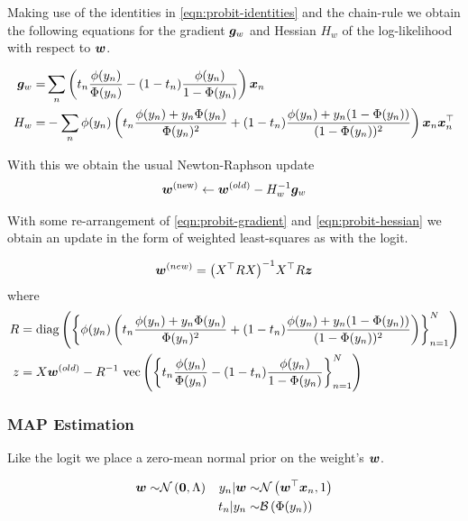 Making use of the identities in \eqref{eqn:probit-identities} and the chain-rule we obtain the following equations for the gradient $\bm g_w$ and Hessian $H_w$ of the log-likelihood with respect to $\bm w$.

\begin{align}
\bm g_w = & \sum_n \left( t_n \frac{\phi(y_n)}{\Phi(y_n)} - (1 - t_n) \frac{\phi(y_n)}{1 - \Phi(y_n)} \right) \bm x_n \label{eqn:probit-gradient}\\
H_w = & - \sum_n \phi(y_n) \left(
    t_n \frac{\phi(y_n) + y_n \Phi(y_n)}{\Phi(y_n)^2} + (1-t_n) \frac{\phi(y_n) + y_n (1-\Phi(y_n))}{(1 - \Phi(y_n))^2}
\right) \bm x_n \bm x_n^\top \label{eqn:probit-hessian}
\end{align}

With this we obtain the usual Newton-Raphson update
\begin{align}
\bm w^{(\text{new})} \leftarrow \bm w^{(old)} - H_w^{-1} \bm g_w
\end{align}

With some re-arrangement of \eqref{eqn:probit-gradient} and \eqref{eqn:probit-hessian} we obtain an update in the form of weighted least-squares as with the logit.

\begin{align}
\bm w^{(new)} = {\left( X^\top R X \right)}^{-1}X^\top R \bm z
\end{align}
where
\begin{align}
R & = \text{diag} \left( {\left\{ \phi(y_n) \left(
    t_n \frac{\phi(y_n) + y_n \Phi(y_n)}{\Phi(y_n)^2} + (1-t_n) \frac{\phi(y_n) + y_n (1-\Phi(y_n))}{(1 - \Phi(y_n))^2}
\right) \right\}_{n=1}^N} \right) \\
z & = X \bm w^{(old)}  - {R}^{-1} \text{ vec} \left(\left\{ t_n \frac{\phi(y_n)}{\Phi(y_n)} - (1 - t_n) \frac{\phi(y_n)}{1 - \Phi(y_n)} \right\}_{n=1}^N\right)
\end{align}



\subsubsection*{MAP Estimation}
Like the logit we place a zero-mean normal prior on the weight's $\bm w$.

\begin{align}
\bm w \sim & \mathcal{N} \left( {\bm 0}, {\Lambda} \right) & y_n | \bm w \sim & \mathcal{N} \left( {\bm w^\top\bm x_n}, {1} \right) \\
\text{ } & \text{ } & t_n | y_n \sim & \mathcal{B}\left( \Phi(y_n) \right)
\end{align}

